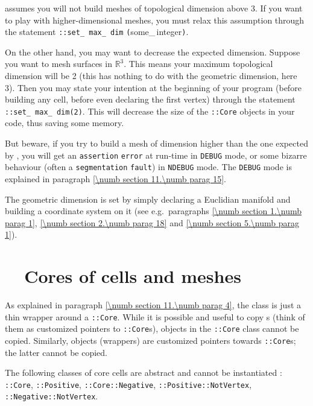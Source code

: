 \leavevmode {\ManiFEM} assumes you will not build meshes of topological dimension
above 3.
If you want to play with higher-dimensional meshes, you must relax this assumption
through the statement {\small\tt{}::set\_\,max\_\,dim}
{\small\tt (}some\_\,integer{\small\tt )}.

On the other hand, you may want to decrease the expected dimension.
Suppose you want to mesh surfaces in $ \mathbb{R}^3 $.
This means your maximum topological dimension will be 2
(this has nothing to do with the geometric dimension, here 3).
Then you may state your intention at the beginning of your program
(before building any cell, before even declaring the first vertex) through
the statement {\small\tt{}::set\_\,max\_\,dim(2)}.
This will decrease the size of the {\small\tt{}::Core} objects in your code,
thus saving some memory.

But beware, if you try to build a mesh of dimension higher than the one expected by
\maniFEM, you will get an {\small\tt assertion} {\small\tt error} at run-time in
{\small\tt DEBUG} mode, or some bizarre behaviour (often a {\small\tt segmentation}
{\small\tt fault}) in {\small\tt NDEBUG} mode.
The {\small\tt DEBUG} mode is explained in paragraph \ref{\numb section 11.\numb parag 15}.

The geometric dimension is set by simply declaring a Euclidian manifold and building
a coordinate system on it (see e.g.\ paragraphs \ref{\numb section 1.\numb parag 1},
\ref{\numb section 2.\numb parag 18} and \ref{\numb section 5.\numb parag 1}).


\section{~~Cores of cells and meshes}\label{\numb section 11.\numb parag 8}

As explained in paragraph \ref{\numb section 11.\numb parag 4}, the {\small\tt{}}
class is just a thin wrapper around a {\small\tt{}::Core}.
While it is possible and useful to copy {\small\tt{}}s (think of them as customized
pointers to {\small\tt{}::Core}s), objects in the {\small\tt{}::Core}
class cannot be copied.
Similarly, {\small\tt{}} objects (wrappers) are customized pointers towards
{\small\tt{}::Core}s; the latter cannot be copied.

The following classes of core cells are abstract and cannot be instantiated :
{\small\tt{}::Core}, {\small\tt{}::Positive},
{\small\tt{}::Core::Negative}, {\small\tt{}::Positive::NotVertex},
{\small\tt{}::Negative::NotVertex}.

